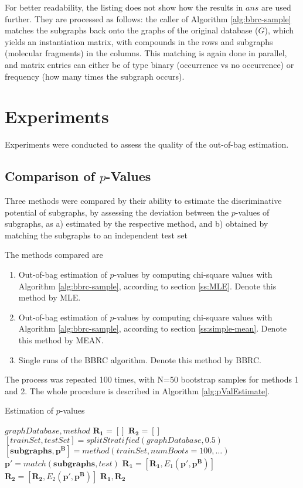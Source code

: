 \documentclass{article}
\begin{document}
For better readability, the listing does not show how the results in $ans$ are used further. They are processed as follows: the caller of Algorithm \ref{alg:bbrc-sample} matches the subgraphs back onto the graphs of the original database ($G$), which yields an instantiation matrix, with compounds in the rows and subgraphs (molecular fragments) in the columns. This matching is again done in parallel, and matrix entries can either be of type binary (occurrence vs no occurrence) or frequency (how many times the subgraph occurs).

\section{Experiments}
Experiments were conducted to assess the quality of the out-of-bag estimation.

\subsection{Comparison of $p$-Values}
Three methods were compared by their ability to estimate the discriminative potential of subgraphs, by assessing the deviation between the $p$-values of subgraphs, as
a) estimated by the respective method, and 
b) obtained by matching the subgraphs to an independent test set

The methods compared are

\begin{enumerate}
  \item{Out-of-bag estimation of $p$-values by computing chi-square values with Algorithm \ref{alg:bbrc-sample}, according to section \ref{ss:MLE}. Denote this method by MLE.}
  \item{Out-of-bag estimation of $p$-values by computing chi-square values with Algorithm \ref{alg:bbrc-sample}, according to section \ref{ss:simple-mean}. Denote this method by MEAN.}
  \item{Single runs of the BBRC algorithm. Denote this method by BBRC.} 
\end{enumerate}

The process was repeated 100 times, with N=50 bootstrap samples for methods 1 and 2. The whole procedure is described in Algorithm \ref{alg:pValEstimate}.
\begin{algorithm}
  \caption{Estimation of $p$-values}
  \label{alg:pValEstimate}
\begin{algorithmic}[1]
  \Require $graphDatabase, method$ 
  \State $\mathbf{R_1}=\left[ \right]$
  \State $\mathbf{R_2}=\left[ \right]$
    \State $[trainSet, testSet] = splitStratified(graphDatabase,0.5)$ 
    \State $\left[ \mathbf{subgraphs}, \mathbf{p^B} \right] = method(trainSet,numBoots=100,\dots)$ 
    \State $\mathbf{p'} = match(\mathbf{subgraphs}, test)$ 
    \State $ \mathbf{R_1} = \left[ \mathbf{R_1}, E_1(\mathbf{p'}, \mathbf{p^B}) \right]$
    \State $ \mathbf{R_2} = \left[ \mathbf{R_2}, E_2(\mathbf{p'}, \mathbf{p^B}) \right]$
  \EndFor
  \Ensure $\mathbf{R_1},\mathbf{R_2}$
\end{algorithmic}
\end{algorithm}
\end{document}
